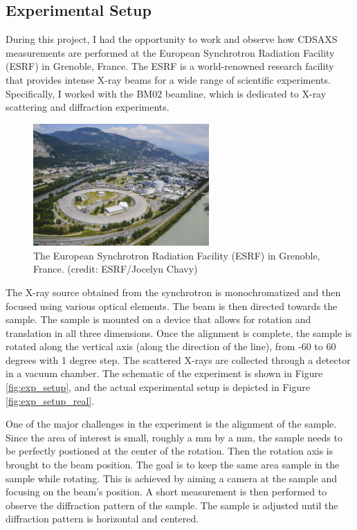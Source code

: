 \medskip




\subsection{Experimental Setup}

During this project, I had the opportunity to work and observe how CDSAXS 
measurements are performed at the European Synchrotron Radiation Facility (ESRF)
in Grenoble, France. The ESRF is a world-renowned research facility that provides
intense X-ray beams for a wide range of scientific experiments. Specifically,
I worked with the BM02 beamline, which is dedicated to X-ray scattering and
   diffraction experiments.

\begin{figure}[h]
\centering
\includegraphics[width=0.6\textwidth]{images/esrf.jpg}
\caption{The European Synchrotron Radiation Facility (ESRF) in Grenoble, France. (credit: ESRF/Jocelyn Chavy)}
\label{fig
}
\end{figure}

The X-ray source obtained from the synchrotron is monochromatized and then focused using
various optical elements. The beam is then directed towards the sample. The 
sample is mounted on a device that allows for rotation and translation in all 
three dimensions. Once the alignment is complete, the sample is rotated along the vertical axis (along the direction of the line), from -60
to 60 degrees with 1 degree step. The scattered X-rays are collected through a detector in a 
vacuum chamber. The schematic of the experiment is shown in Figure \ref{fig:exp_setup},
and the actual experimental setup is depicted in Figure \ref{fig:exp_setup_real}.

\medskip

One of the major challenges in the experiment is the alignment of the sample. Since the area of interest is small, roughly a mm by a mm,
the sample needs to be perfectly postioned at the center of the rotation. Then the rotation axis is brought to the beam position. 
The goal is to keep the same area sample in the sample while rotating. This is achieved by 
aiming a camera at the sample and focusing on the beam's position. A short  measurement is then performed to observe the diffraction pattern of the sample.
The sample is adjusted until the diffraction pattern is horizontal and centered.

